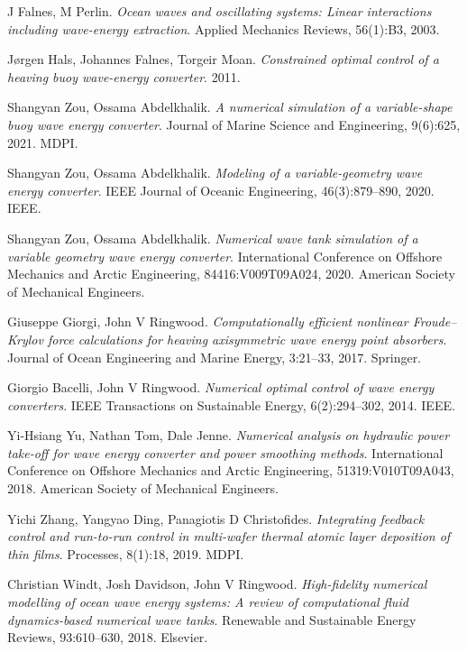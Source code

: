 \documentclass{article}
\begin{document}
\begin{thebibliography}{99}
J Falnes, M Perlin.
\textit{Ocean waves and oscillating systems: Linear interactions including wave-energy extraction}.
Applied Mechanics Reviews, 56(1):B3, 2003.

Jørgen Hals, Johannes Falnes, Torgeir Moan.
\textit{Constrained optimal control of a heaving buoy wave-energy converter}.
2011.

Shangyan Zou, Ossama Abdelkhalik.
\textit{A numerical simulation of a variable-shape buoy wave energy converter}.
Journal of Marine Science and Engineering, 9(6):625, 2021.
MDPI.

Shangyan Zou, Ossama Abdelkhalik.
\textit{Modeling of a variable-geometry wave energy converter}.
IEEE Journal of Oceanic Engineering, 46(3):879--890, 2020.
IEEE.

Shangyan Zou, Ossama Abdelkhalik.
\textit{Numerical wave tank simulation of a variable geometry wave energy converter}.
International Conference on Offshore Mechanics and Arctic Engineering, 84416:V009T09A024, 2020.
American Society of Mechanical Engineers.

Giuseppe Giorgi, John V Ringwood.
\textit{Computationally efficient nonlinear Froude--Krylov force calculations for heaving axisymmetric wave energy point absorbers}.
Journal of Ocean Engineering and Marine Energy, 3:21--33, 2017.
Springer.

Giorgio Bacelli, John V Ringwood.
\textit{Numerical optimal control of wave energy converters}.
IEEE Transactions on Sustainable Energy, 6(2):294--302, 2014.
IEEE.

Yi-Hsiang Yu, Nathan Tom, Dale Jenne.
\textit{Numerical analysis on hydraulic power take-off for wave energy converter and power smoothing methods}.
International Conference on Offshore Mechanics and Arctic Engineering, 51319:V010T09A043, 2018.
American Society of Mechanical Engineers.

Yichi Zhang, Yangyao Ding, Panagiotis D Christofides.
\textit{Integrating feedback control and run-to-run control in multi-wafer thermal atomic layer deposition of thin films}.
Processes, 8(1):18, 2019.
MDPI.

Christian Windt, Josh Davidson, John V Ringwood.
\textit{High-fidelity numerical modelling of ocean wave energy systems: A review of computational fluid dynamics-based numerical wave tanks}.
Renewable and Sustainable Energy Reviews, 93:610--630, 2018.
Elsevier.


\end{thebibliography}
\end{document}

